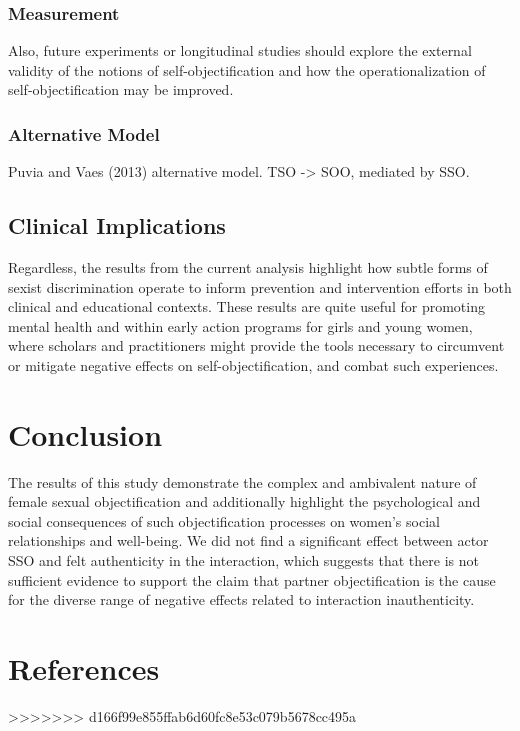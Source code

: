 \documentclass[
  man]{apa6}
\begin{document}
\subsubsection{Measurement}\label{measurement}

Also, future experiments or longitudinal studies should explore the
external validity of the notions of self-objectification and how the
operationalization of self-objectification may be improved.

\subsubsection{Alternative Model}\label{alternative-model}

Puvia and Vaes (2013) alternative model. TSO -\textgreater{} SOO,
mediated by SSO.

\subsection{Clinical Implications}\label{clinical-implications}

Regardless, the results from the current analysis highlight how subtle
forms of sexist discrimination operate to inform prevention and
intervention efforts in both clinical and educational contexts. These
results are quite useful for promoting mental health and within early
action programs for girls and young women, where scholars and
practitioners might provide the tools necessary to circumvent or
mitigate negative effects on self-objectification, and combat such
experiences.

\section{Conclusion}\label{conclusion}

The results of this study demonstrate the complex and ambivalent nature
of female sexual objectification and additionally highlight the
psychological and social consequences of such objectification processes
on women's social relationships and well-being. We did not find a
significant effect between actor SSO and felt authenticity in the
interaction, which suggests that there is not sufficient evidence to
support the claim that partner objectification is the cause for the
diverse range of negative effects related to interaction inauthenticity.

\section{References}\label{references}
>>>>>>> d166f99e855ffab6d60fc8e53c079b5678cc495a
\end{document}

